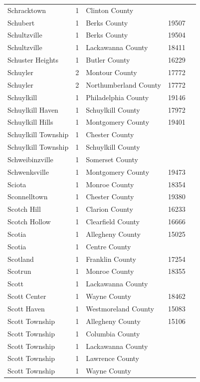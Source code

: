 \documentclass{article}
\begin{document}
\begin{tabular}{lllll}
Schracktown & 1 & Clinton County &  &  \\
Schubert & 1 & Berks County & 19507 &  \\
Schultzville & 1 & Berks County & 19504 &  \\
Schultzville & 1 & Lackawanna County & 18411 &  \\
Schuster Heights & 1 & Butler County & 16229 &  \\
Schuyler & 2 & Montour County & 17772 &  \\
Schuyler & 2 & Northumberland County & 17772 &  \\
Schuylkill & 1 & Philadelphia County & 19146 &  \\
Schuylkill Haven & 1 & Schuylkill County & 17972 &  \\
Schuylkill Hills & 1 & Montgomery County & 19401 &  \\
Schuylkill Township & 1 & Chester County &  &  \\
Schuylkill Township & 1 & Schuylkill County &  &  \\
Schweibinzville & 1 & Somerset County &  &  \\
Schwenksville & 1 & Montgomery County & 19473 &  \\
Sciota & 1 & Monroe County & 18354 &  \\
Sconnelltown & 1 & Chester County & 19380 &  \\
Scotch Hill & 1 & Clarion County & 16233 &  \\
Scotch Hollow & 1 & Clearfield County & 16666 &  \\
Scotia & 1 & Allegheny County & 15025 &  \\
Scotia & 1 & Centre County &  &  \\
Scotland & 1 & Franklin County & 17254 &  \\
Scotrun & 1 & Monroe County & 18355 &  \\
Scott & 1 & Lackawanna County &  &  \\
Scott Center & 1 & Wayne County & 18462 &  \\
Scott Haven & 1 & Westmoreland County & 15083 &  \\
Scott Township & 1 & Allegheny County & 15106 &  \\
Scott Township & 1 & Columbia County &  &  \\
Scott Township & 1 & Lackawanna County &  &  \\
Scott Township & 1 & Lawrence County &  &  \\
Scott Township & 1 & Wayne County &  &  \\

\end{tabular}
\end{document}
